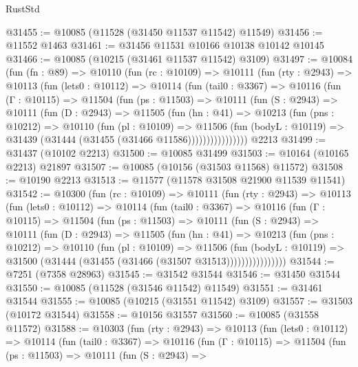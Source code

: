 \begin{lexlean}{RustStd}
\begin{coremodule}
@31455 := @10085 (@11528 (@31450 @11537 @11542) @11549)
@31456 := @11552 @1463
@31461 := @31456 @11531 @10166 @10138 @10142 @10145
@31466 := @10085 (@10215 (@31461 @11537 @11542) @3109)
@31497 := @10084
    (fun (fn : @89) =>
    @10110
      (fun (rc : @10109) =>
      @10111
        (fun (rty : @2943) =>
        @10113
          (fun (lets0 : @10112) =>
          @10114
            (fun (tail0 : @3367) =>
            @10116
              (fun (Γ : @10115) =>
              @11504
                (fun (ps : @11503) =>
                @10111
                  (fun (S : @2943) =>
                  @10111
                    (fun (D : @2943) =>
                    @11505
                      (fun (hn : @41) =>
                      @10213
                        (fun (pns : @10212) =>
                        @10110
                          (fun (pl : @10109) =>
                          @11506
                            (fun (bodyL : @10119) =>
                            @31439 (@31444 (@31455 (@31466 @11586))))))))))))))))
    @2213
@31499 := @31437 (@10102 @2213)
@31500 := @10085 @31499
@31503 := @10164 (@10165 @2213) @21897
@31507 := @10085 (@10156 (@31503 @11568) @11572)
@31508 := @10190 @2213
@31513 := @11577 (@11578 @31508 @21900 @11539 @11541)
@31542 := @10300
    (fun (rc : @10109) =>
    @10111
      (fun (rty : @2943) =>
      @10113
        (fun (lets0 : @10112) =>
        @10114
          (fun (tail0 : @3367) =>
          @10116
            (fun (Γ : @10115) =>
            @11504
              (fun (ps : @11503) =>
              @10111
                (fun (S : @2943) =>
                @10111
                  (fun (D : @2943) =>
                  @11505
                    (fun (hn : @41) =>
                    @10213
                      (fun (pns : @10212) =>
                      @10110
                        (fun (pl : @10109) =>
                        @11506
                          (fun (bodyL : @10119) =>
                          @31500 (@31444 (@31455 (@31466 (@31507 @31513))))))))))))))))
@31544 := @7251 (@7358 @28963)
@31545 := @31542 @31544
@31546 := @31450 @31544
@31550 := @10085 (@11528 (@31546 @11542) @11549)
@31551 := @31461 @31544
@31555 := @10085 (@10215 (@31551 @11542) @3109)
@31557 := @31503 (@10172 @31544)
@31558 := @10156 @31557
@31560 := @10085 (@31558 @11572)
@31588 := @10303
    (fun (rty : @2943) =>
    @10113
      (fun (lets0 : @10112) =>
      @10114
        (fun (tail0 : @3367) =>
        @10116
          (fun (Γ : @10115) =>
          @11504
            (fun (ps : @11503) =>
            @10111
              (fun (S : @2943) =>

\end{coremodule}
\end{lexlean}
